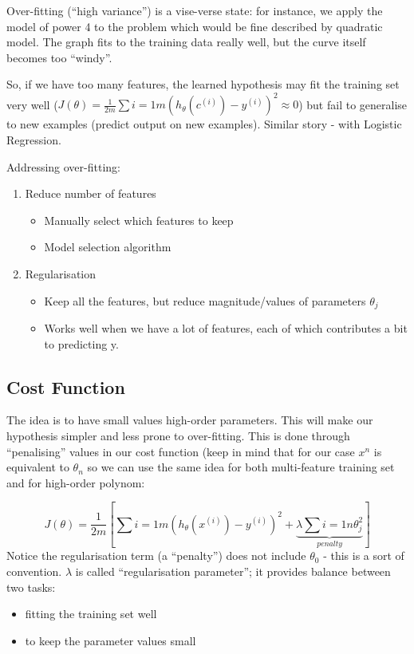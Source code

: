 \documentclass{scrartcl}
\begin{document}
Over-fitting (``high variance'') is a vise-verse state: for instance,
we apply the model of power 4 to the problem which would be fine
described by quadratic model. The graph fits to the training data
really well, but the curve itself becomes too ``windy''.

So, if we have too many features, the learned hypothesis may fit the
training set very well ($J(\theta) = \frac{1}{2m} \sum
\limits{i=1}{m}(h_\theta(c^{(i)}) - y^{(i)})^2 \approx 0$) but fail to
generalise to new examples (predict output on new examples). Similar
story - with Logistic Regression.

Addressing over-fitting:
\begin{enumerate}
\item Reduce number of features
  \begin{itemize}
  \item Manually select which features to keep
  \item Model selection algorithm
  \end{itemize}
\item Regularisation
  \begin{itemize}
  \item Keep all the features, but reduce magnitude/values of
    parameters $\theta_j$
  \item Works well when we have a lot of features, each of which
    contributes a bit to predicting y.
  \end{itemize}
\end{enumerate}

\subsection{Cost Function}
\label{sec:7-2}
The idea is to have small values high-order parameters. This will make
our hypothesis simpler and less prone to over-fitting. This is done
through ``penalising'' values in our cost function (keep in mind that
for our case $x^n$ is equivalent to $\theta_n$ so we can use the same
idea for both multi-feature training set and for high-order polynom:

\[J(\theta) = \frac{1}{2m} \left[ \sum \limits{i=1}{m}
  (h_\theta(x^{(i)}) - y^{(i)})^2 + \underbrace{ \lambda \sum
  \limits{i=1}{n}\theta_j^2}_{penalty} \right] \]
Notice the regularisation term (a ``penalty'') does not include
$\theta_0$ - this is a sort of convention. $\lambda$ is called
``regularisation parameter''; it provides balance between two tasks:
\begin{itemize}
\item fitting the training set well
\item to keep the parameter values small
\end{itemize}
\end{document}
